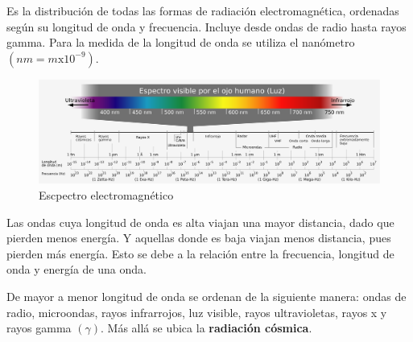 Es la distribución de todas las formas de radiación electromagnética, ordenadas según su longitud de onda y frecuencia. Incluye desde ondas de radio hasta rayos gamma. Para la medida de la longitud de onda se utiliza el nanómetro $(nm = m\text{x}10^{-9})$.

\begin{figure}[H]
  \centering
  \includegraphics[scale=0.5]{imagenes/espectro_electromagnetico.png}
  \caption{Escpectro electromagnético\cite{wikielcmgnspc}}
\end{figure}

Las ondas cuya longitud de onda es alta viajan una mayor distancia, dado que pierden menos energía. Y aquellas donde es baja viajan menos distancia, pues pierden más energía. Esto se debe a la relación entre la frecuencia, longitud de onda y energía de una onda.

De mayor a menor longitud de onda se ordenan de la siguiente manera: ondas de radio, microondas, rayos infrarrojos, luz visible, rayos ultravioletas, rayos x y rayos gamma $(\gamma)$. Más allá se ubica la \textbf{radiación cósmica}.
